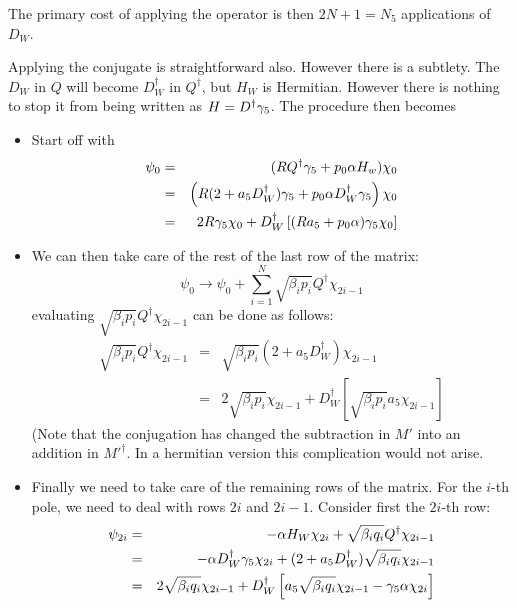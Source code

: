 \documentclass[12pt]{article}
\begin{document}
The primary cost of applying the operator is then $2N+1=N_5$ applications of $D_W$.

Applying the conjugate is straightforward also. However there is a subtlety.
The $D_W$ in $Q$ will become $D_W^{\dagger}$ in $Q^{\dagger}$, but $H_W$ is
Hermitian. However there is nothing to stop it from being written as
$H = D^{\dagger} \gamma_5$. The procedure then becomes

\begin{itemize}
\item
Start off with
\begin{eqnarray}
\psi_{0} &=& (R Q^{\dagger} \gamma_5 + p_0 \alpha H_w) \chi_0 \\
         &=& \left( R ( 2 + a_5 D_W^{\dagger} ) \gamma_5  + p_0 \alpha D_W^{\dagger} \gamma_5 \right) \chi_0 \\
         &=& 2 R \gamma_5 \chi_0 +  D_W^{\dagger} \left[ ( R a_5 + p_0 \alpha ) \gamma_5 \chi_0 \right]
\end{eqnarray}
\item
We can then take care of the rest of the last row of the matrix:
\begin{equation}
\psi_0 \rightarrow \psi_0 + \sum_{i=1}^{N} \sqrt{\beta_{i} p_{i}} Q^{\dagger} \chi_{2i-1} 
\end{equation}
evaluating $  \sqrt{\beta_{i} p_{i}} Q^{\dagger} \chi_{2i-1}$ can be done as follows:
\begin{eqnarray}
 \sqrt{\beta_{i} p_{i}} Q^{\dagger} \chi_{2i-1} &=&  \sqrt{\beta_{i} p_{i}} ( 2 + a_5 D_W^{\dagger} ) \chi_{2i-1} \\
 &=&  2 \sqrt{\beta_{i} p_{i}} \chi_{2i-1} + D_W^{\dagger} \left[ \sqrt{\beta_{i} p_{i}} a_5 \chi_{2i-1} \right]
\end{eqnarray}
(Note that the conjugation has changed the subtraction in $M'$ into an
addition in $M'^{\dagger}$. In a hermitian version this complication
would not arise.
\item
Finally we need to take care of the remaining rows of the matrix. For the 
$i$-th pole, we need to deal with rows $2i$ and $2i-1$.
Consider first the $2i$-th row:
\begin{eqnarray}
\psi_{2i} &=& -\alpha H_W \chi_{2i} + \sqrt{\beta_{i} q_{i}} Q^{\dagger} \chi_{2i-1} \\
 &=& - \alpha D_W^{\dagger} \gf \chi_{2i} + (2 + a_5 D_W^{\dagger} )  \sqrt{\beta_{i} q_{i}}\chi_{2i-1} \\
 &=& 2 \sqrt{\beta_{i} q_{i}}\chi_{2i-1} + D_W^{\dagger} \left[ a_5 \sqrt{\beta_{i} q_{i}} \chi_{2i-1} - \gf \alpha \chi_{2i} \right]

\end{eqnarray}
\end{itemize}
\end{document}
